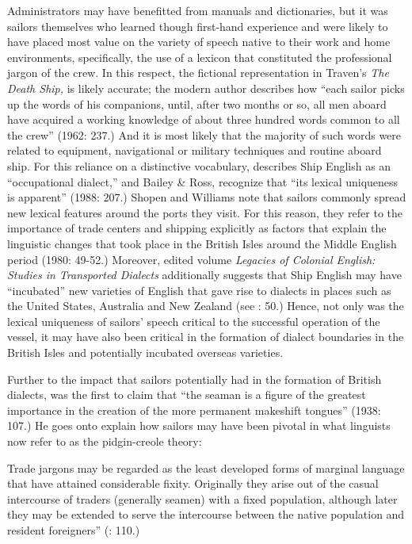 Administrators may have benefitted from manuals and dictionaries, but it was sailors themselves who learned though first-hand experience and were likely to have placed most value on the variety of speech native to their work and home environments, specifically, the use of a lexicon that constituted the professional jargon of the crew. In this respect, the fictional representation in Traven’s \textit{The Death Ship,} is likely accurate; the modern author describes how “each sailor picks up the words of his companions, until, after two months or so, all men aboard have acquired a working knowledge of about three hundred words common to all the crew” (1962: 237.) And it is most likely that the majority of such words were related to equipment, navigational or military techniques and routine aboard ship. For this reliance on a distinctive vocabulary, \citet{Hancock1986} describes Ship English as an “occupational dialect,” and Bailey \& Ross, recognize that “its lexical uniqueness is apparent” (1988: 207.) Shopen and Williams note that sailors commonly spread new lexical features around the ports they visit. For this reason, they refer to the importance of trade centers and shipping explicitly as factors that explain the linguistic changes that took place in the British Isles around the Middle English period (1980: 49-52.) Moreover,  edited volume \textit{Legacies of Colonial English: Studies in Transported Dialects} additionally suggests that Ship English may have “incubated” new varieties of English that gave rise to dialects in places such as the United States, Australia and New Zealand (see \citealt{Hickey2004}: 50.) Hence, not only was the lexical uniqueness of sailors’ speech critical to the successful operation of the vessel, it may have also been critical in the formation of dialect boundaries in the British Isles and potentially incubated overseas varieties.

Further to the impact that sailors potentially had in the formation of British dialects, \citet{Reinecke1938} was the first to claim that “the seaman is a figure of the greatest importance in the creation of the more permanent makeshift tongues” (1938: 107.) He goes onto explain how sailors may have been pivotal in what linguists now refer to as the pidgin-creole theory:

Trade jargons may be regarded as the least developed forms of marginal language that have attained considerable fixity. Originally they arise out of the casual intercourse of traders (generally seamen) with a fixed population, although later they may be extended to serve the intercourse between the native population and resident foreigners” (\citealt{Reinecke1938}: 110.) 

